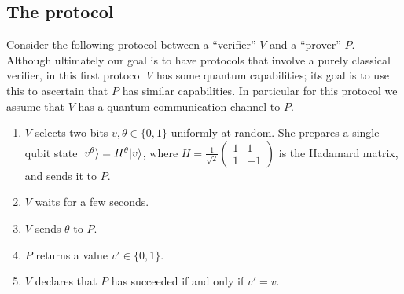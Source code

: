 \subsection{The protocol}
\label{sec:firstprotocol}

Consider the following protocol between a ``verifier'' $V$ and a ``prover'' $P$. Although ultimately our goal is to have protocols that involve a purely classical verifier, in this first protocol $V$ has some quantum capabilities; its goal is to use this to ascertain that $P$ has similar capabilities. In particular for this protocol we assume that $V$ has a quantum communication channel to $P$. 

\begin{enumerate}
\item $V$ selects two bits $v,\theta\in\{0,1\}$ uniformly at random. She prepares a single-qubit state $|v^\theta\rangle = H^\theta |v\rangle$, where $H = \frac{1}{\sqrt{2}} \begin{pmatrix} 1 & 1 \\ 1 & -1\end{pmatrix}$ is the Hadamard matrix, and sends it to $P$. 
\item $V$ waits for a few seconds. 
\item $V$ sends $\theta$ to $P$. 
\item $P$ returns a value $v'\in\{0,1\}$. 
\item $V$ declares that $P$ has succeeded if and only if $v'=v$.
\end{enumerate}

